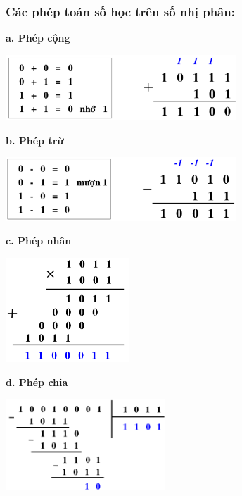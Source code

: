 \subsubsection{Các phép toán số học trên số nhị phân:}
\noindent\textbf{a. Phép cộng}
\begin{center}
    \includegraphics[width = 0.65\textwidth]{./local/image/5.png}
\end{center}
\textbf{b. Phép trừ}
\begin{center}
    \includegraphics[width = 0.65\textwidth]{./local/image/6.png}
\end{center}
\textbf{c. Phép nhân}
\begin{center}
    \includegraphics[width = 0.35\textwidth]{./local/image/7.png}
\end{center}
\textbf{d. Phép chia}
\begin{center}
    \includegraphics[width = 0.45\textwidth]{./local/image/8.png}
\end{center}
